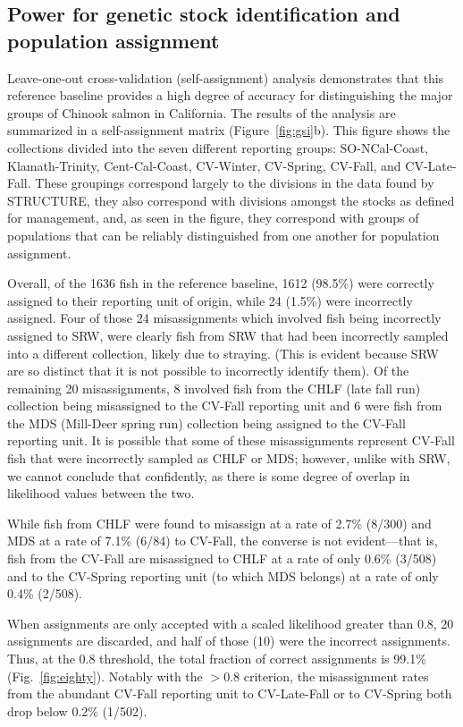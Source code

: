 \subsection*{Power for genetic stock identification and population assignment}

Leave-one-out cross-validation (self-assignment) analysis demonstrates that this
reference baseline provides a high degree of accuracy for distinguishing the major
groups of Chinook salmon in California.  The results of the analysis are summarized
in a self-assignment matrix (Figure~\ref{fig:gsi}b).
This figure shows the collections divided into the seven different reporting groups:
SO-NCal-Coast,  Klamath-Trinity, Cent-Cal-Coast,
CV-Winter, CV-Spring, CV-Fall, and  CV-Late-Fall.  These groupings correspond
largely to the divisions in the data found by STRUCTURE, they also correspond
with divisions amongst the stocks as defined for management, and, as seen in the
figure, they correspond with groups of populations that can be reliably distinguished
from one another for population assignment.

Overall, of the 1636 fish in the reference baseline, 1612 (98.5\%) were correctly
assigned to their reporting unit of origin, while 24 (1.5\%) were incorrectly assigned.
Four of those 24 misassignments which involved fish being incorrectly assigned to
SRW, were clearly fish from SRW that had been incorrectly sampled into a different
collection, likely due to straying. (This is evident because SRW are so distinct that it is not possible
to incorrectly identify them).  Of the remaining 20 misassignments,  8 involved fish from the
CHLF (late fall run) collection being misassigned to the CV-Fall reporting unit and 6 were
fish from the MDS (Mill-Deer spring run) collection being assigned to the CV-Fall reporting unit.
It is possible that some of these misassignments represent CV-Fall fish that were incorrectly
sampled as CHLF or MDS; however, unlike with SRW,  we  cannot conclude that
confidently, as there is some degree of overlap in likelihood values between the two.

While fish from CHLF were found to misassign at a rate of 2.7\% (8/300) and MDS at a rate
of 7.1\% (6/84) to CV-Fall, the
converse is not evident---that is, fish from the CV-Fall are misassigned to CHLF at a rate
of only 0.6\% (3/508) and to the CV-Spring reporting unit (to which MDS belongs) at a rate
of only 0.4\% (2/508).

When assignments are only accepted with a scaled likelihood greater than 0.8,
20 assignments are discarded, and half of those (10) were the incorrect assignments.  Thus,
at the 0.8 threshold, the total fraction of correct assignments is 99.1\% (Fig.~\ref{fig:eighty}).
Notably with the $>0.8$ criterion, the misassignment rates from the abundant CV-Fall
reporting unit to CV-Late-Fall or to CV-Spring both drop below 0.2\% (1/502).  

